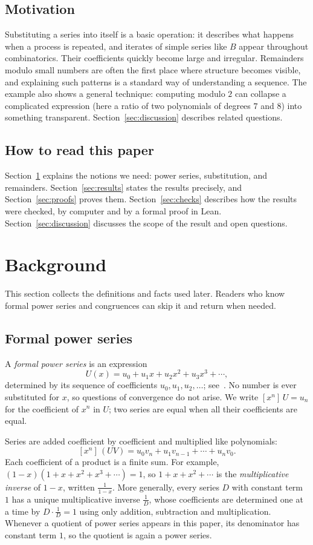 \documentclass[11pt,a4paper]{article}
\theoremstyle{definition}
\theoremstyle{remark}
\newcommand{\coeff}[2]{[x^{#1}]\,#2}
\begin{document}
\subsection{Motivation}
Substituting a series into itself is a basic operation: it describes what happens when a process is repeated, and
iterates of simple series like $B$ appear throughout combinatorics. Their coefficients quickly become large and
irregular. Remainders modulo small numbers are often the first place where structure becomes visible, and explaining
such patterns is a standard way of understanding a sequence. The example also shows a general technique: computing
modulo $2$ can collapse a complicated expression (here a ratio of two polynomials of degrees $7$ and $8$) into something
transparent. Section~\ref{sec:discussion} describes related questions.

\subsection{How to read this paper}
Section~\ref{sec:background} explains the notions we need: power series, substitution, and remainders. Section~\ref{sec:results}
states the results precisely, and Section~\ref{sec:proofs} proves them. Section~\ref{sec:checks} describes how the results were
checked, by computer and by a formal proof in Lean. Section~\ref{sec:discussion} discusses the scope of the result and
open questions.
\section{Background}\label{sec:background}
This section collects the definitions and facts used later. Readers who know formal power series and congruences can skip it and return when needed.
\subsection{Formal power series}
A \emph{formal power series} is an expression
\[
U(x)=u_0+u_1x+u_2x^2+u_3x^3+\cdots ,
\]
determined by its sequence of coefficients $u_0,u_1,u_2,\dots$; see~\cite{niven,stanley}. No number is ever
substituted for $x$, so questions of convergence do not arise. We write $\coeff{n}{U}=u_n$ for the coefficient of $x^n$ in $U$; two series are equal
when all their coefficients are equal.

Series are added coefficient by coefficient and multiplied like polynomials:
\[
\coeff{n}{(UV)}=u_0v_n+u_1v_{n-1}+\cdots+u_nv_0 .
\]
Each coefficient of a product is a finite sum. For example, $(1-x)(1+x+x^2+x^3+\cdots)=1$, so $1+x+x^2+\cdots$ is
the \emph{multiplicative inverse} of $1-x$, written $\frac{1}{1-x}$. More generally, every series $D$ with constant term
$1$ has a unique multiplicative inverse $\frac1D$, whose coefficients are determined one at a time by $D\cdot\frac1D=1$
using only addition, subtraction and multiplication. Whenever a quotient of power series appears in this paper, its
denominator has constant term $1$, so the quotient is again a power series.
\end{document}
